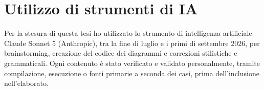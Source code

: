 \chapter*{Utilizzo di strumenti di IA}
Per la stesura di questa tesi ho utilizzato lo strumento di intelligenza artificiale Claude Sonnet 5 (Anthropic), tra la fine di luglio e i primi di settembre 2026, per brainstorming, creazione del codice dei diagrammi e correzioni stilistiche e grammaticali. Ogni contenuto è stato verificato e validato personalmente, tramite compilazione, esecuzione o fonti primarie a seconda dei casi, prima dell'inclusione nell'elaborato.
